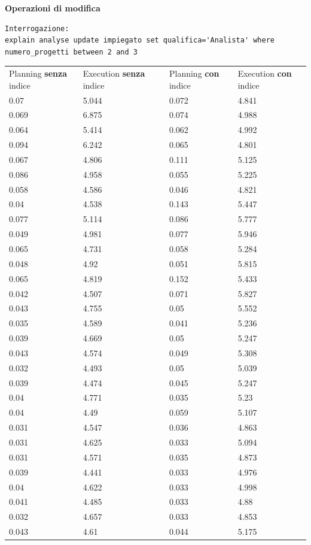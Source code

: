 \documentclass{article}
\begin{document}
\newpage
\noindent
\textbf{Operazioni di modifica}
\begin{verbatim}
Interrogazione:
explain analyse update impiegato set qualifica='Analista' where numero_progetti between 2 and 3
\end{verbatim}
\begin{table}[H]
\renewcommand{\arraystretch}{1.1}
\centering
\begin{tabular}{|p{4cm}|p{4cm}|p{0cm}|p{4cm}|p{4cm}|}
\cline{1-5}
Planning \textbf{senza} indice & Execution \textbf{senza} indice & & Planning \textbf{con} indice & Execution \textbf{con} indice \\ \cline{1-5}
0.07 & 5.044 & & 0.072 & 4.841 \\ \cline{1-5}
0.069 & 6.875 & & 0.074 & 4.988 \\ \cline{1-5}
0.064 & 5.414 & & 0.062 & 4.992 \\ \cline{1-5}
0.094 & 6.242 & & 0.065 & 4.801 \\ \cline{1-5}
0.067 & 4.806 & & 0.111 & 5.125 \\ \cline{1-5}
0.086 & 4.958 & & 0.055 & 5.225 \\ \cline{1-5}
0.058 & 4.586 & & 0.046 & 4.821 \\ \cline{1-5}
0.04 & 4.538 & & 0.143 & 5.447 \\ \cline{1-5}
0.077 & 5.114 & & 0.086 & 5.777 \\ \cline{1-5}
0.049 & 4.981 & & 0.077 & 5.946 \\ \cline{1-5}
0.065 & 4.731 & & 0.058 & 5.284 \\ \cline{1-5}
0.048 & 4.92 & & 0.051 & 5.815 \\ \cline{1-5}
0.065 & 4.819 & & 0.152 & 5.433 \\ \cline{1-5}
0.042 & 4.507 & & 0.071 & 5.827 \\ \cline{1-5}
0.043 & 4.755 & & 0.05 & 5.552 \\ \cline{1-5}
0.035 & 4.589 & & 0.041 & 5.236 \\ \cline{1-5}
0.039 & 4.669 & & 0.05 & 5.247 \\ \cline{1-5}
0.043 & 4.574 & & 0.049 & 5.308 \\ \cline{1-5}
0.032 & 4.493 & & 0.05 & 5.039 \\ \cline{1-5}
0.039 & 4.474 & & 0.045 & 5.247 \\ \cline{1-5}
0.04 & 4.771 & & 0.035 & 5.23 \\ \cline{1-5}
0.04 & 4.49 & & 0.059 & 5.107 \\ \cline{1-5}
0.031 & 4.547 & & 0.036 & 4.863 \\ \cline{1-5}
0.031 & 4.625 & & 0.033 & 5.094 \\ \cline{1-5}
0.031 & 4.571 & & 0.035 & 4.873 \\ \cline{1-5}
0.039 & 4.441 & & 0.033 & 4.976 \\ \cline{1-5}
0.04 & 4.622 & & 0.033 & 4.998 \\ \cline{1-5}
0.041 & 4.485 & & 0.033 & 4.88 \\ \cline{1-5}
0.032 & 4.657 & & 0.033 & 4.853 \\ \cline{1-5}
0.043 & 4.61 & & 0.044 & 5.175 \\ \cline{1-5}
\end{tabular}
\end{table}
\end{document}
